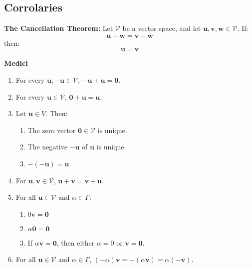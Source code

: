\documentclass{article}
\begin{document}
    \subsection{Corrolaries}
    \begin{theorem}
        \textbf{The Cancellation Theorem:} Let $\mathcal{V}$ be a vector space, and let $\bm{u}, \bm{v}, \bm{w} \in \mathcal{V}$. If:
        \begin{equation}
            \bm{u}+ \bm{w} = \bm{v}+ \bm{w}
        \end{equation}
        then:
        \begin{equation}
            \bm{u} = \bm{v}
        \end{equation}
    \end{theorem}
    \begin{minipage}[t]{.45\textwidth} %
        \begin{center}
            \textbf{Medici}
        \end{center}
        \begin{enumerate}[label = \textbf{Prop \Roman*.}, leftmargin=16mm]
            \item For every $\bm{u}, -\bm{u} \in \mathcal{V}$, $-\bm{u}+\bm{u}=\bm{0}$.
            \item For every $\bm{u} \in \mathcal{V}$, $\bm{0}+\bm{u} = \bm{u}$.
            \item Let $\bm{u} \in V$. Then:
            \begin{enumerate}
                \item The zero vector $\bm{0}\in \mathcal{V}$ is unique.
                \item The negative $-\bm{u}$ of $\bm{u}$ is unique.
                \item $-(\bm{-u})=\bm{u}$.
            \end{enumerate}
            \item For $\bm{u}, \bm{v} \in \mathcal{V}$, $\bm{u}+\bm{v}=\bm{v}+\bm{u}$.
            \item For all $\bm{u}\in \mathcal{V}$ and $\alpha \in \Gamma$:
            \begin{enumerate}
                \item $0\bm{v} = \bm{0}$
                \item $\alpha\bm{0}=\bm{0}$
                \item If $\alpha\bm{v}=\bm{0}$, then either $\alpha=0$ or $\bm{v}=\bm{0}$.
            \end{enumerate}
            \item For all $\bm{u} \in \mathcal{V}$ and $\alpha \in \Gamma$, $(-\alpha)\bm{v} = -(\alpha \bm{v}) = \alpha(-\bm{v})$.
        \end{enumerate}
    \end{minipage} %
\end{document}
